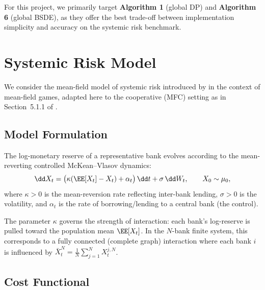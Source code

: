 \documentclass[11pt]{article}
\begin{document}
For this project, we primarily target \textbf{Algorithm 1} (global DP) and \textbf{Algorithm 6} (global BSDE), as they offer the best trade-off between implementation simplicity and accuracy on the systemic risk benchmark.


\section{Systemic Risk Model}\label{sec:appendix-systemic}

We consider the mean-field model of systemic risk introduced by \citet{carmona2015systemic} in the context of mean-field games, adapted here to the cooperative (MFC) setting as in Section~5.1.1 of \citet{pham2024mfnn}.

\subsection{Model Formulation}

The log-monetary reserve of a representative bank evolves according to the mean-reverting controlled McKean--Vlasov dynamics:
\begin{equation}\label{eq:systemic-sde}
  \dd X_t = \big(\kappa(\EE[X_t] - X_t) + \alpha_t\big)\,\dd t + \sigma\,\dd W_t, \qquad X_0 \sim \mu_0,
\end{equation}
where $\kappa > 0$ is the mean-reversion rate reflecting inter-bank lending, $\sigma > 0$ is the volatility, and $\alpha_t$ is the rate of borrowing/lending to a central bank (the control).

The parameter $\kappa$ governs the strength of interaction: each bank's log-reserve is pulled toward the population mean $\EE[X_t]$. In the $N$-bank finite system, this corresponds to a fully connected (complete graph) interaction where each bank $i$ is influenced by $\bar{X}_t^N = \frac{1}{N}\sum_{j=1}^N X_t^{j,N}$.

\subsection{Cost Functional}
\end{document}
